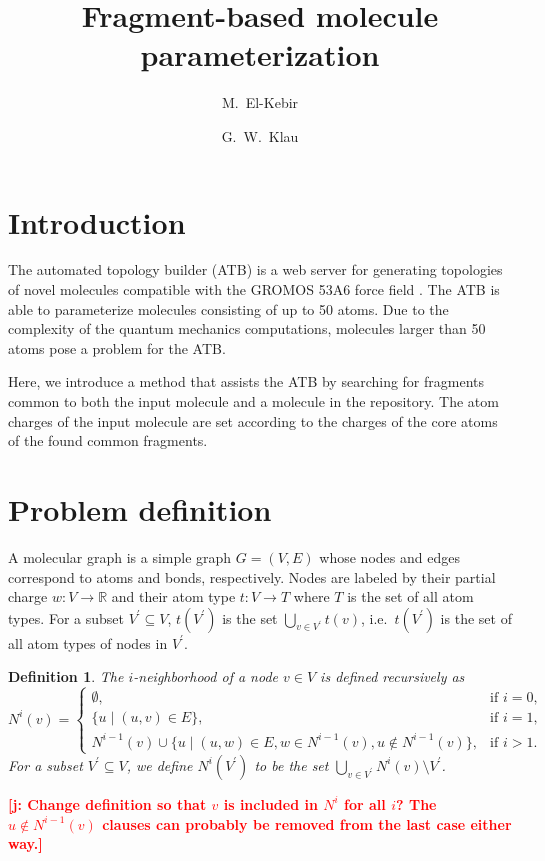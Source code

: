 \documentclass[11pt]{article}
\author{M.~El-Kebir \and  G.~W.~Klau}
\title{Fragment-based molecule parameterization}
\newcommand{\todo}[1]{\xspace{\bfseries\sffamily\textcolor{red}{[#1]}}\xspace}
\newtheorem{definition}{Definition}[section]
\begin{document}
\maketitle

\section{Introduction}

The automated topology builder (ATB) is a web server for generating topologies
of novel molecules compatible with the GROMOS 53A6 force field \cite{Malde11}.
The ATB is able to parameterize molecules consisting of up to 50 atoms. Due to
the complexity of the quantum mechanics computations, molecules larger than 50
atoms pose a problem for the ATB.

Here, we introduce a method that assists the ATB by searching for fragments
common to both the input molecule and a molecule in the repository. The atom
charges of the input molecule are set according to the charges of the core atoms
of the found common fragments.

\section{Problem definition}

A molecular graph is a simple graph $G=(V,E)$ whose nodes and edges correspond
to atoms and bonds, respectively. Nodes are labeled by their partial charge $w :
V \rightarrow \mathbb{R}$ and their atom type $t : V \rightarrow T$ where $T$ is
the set of all atom types. For a subset $V^\prime \subseteq V$, $t(V^\prime)$ is the
set $\bigcup_{v \in V^\prime} t(v)$, i.e.\ $t(V^\prime)$ is the set of all atom
types of nodes in $V^\prime$.

\begin{definition}
  The \emph{$i$-neighborhood} of a node $v \in V$ is defined recursively as
  \[
    N^i(v) = 
  \begin{cases}
    \emptyset, & \mbox{if $i=0$,}\\
    \{ u \mid (u,v) \in E \}, & \mbox{if $i=1$,}\\
    N^{i-1}(v) \cup \{ u \mid (u,w) \in E, w \in N^{i-1}(v), u \not \in
    N^{i-1}(v) \}, & \mbox{if $i > 1$.}
  \end{cases}
  \]
  For a subset $V^\prime \subseteq V$, we define $N^i(V^\prime)$ to
  be the set $\bigcup_{v \in V^\prime} N^i(v) \setminus V^\prime$.
\end{definition}
\todo{j: Change definition so that $v$ is included in $N^i$ for all $i$? The $u \not\in N^{i-1}(v)$ clauses can probably be removed from the last case either way.}
\end{document}
